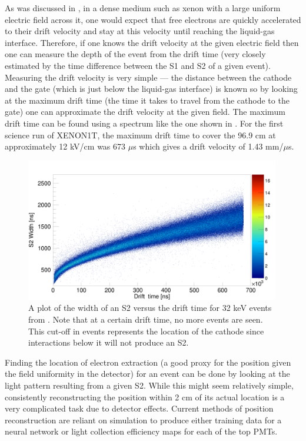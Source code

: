 As was discussed in , in a dense medium such as xenon with a large uniform electric field across it, one would expect that free electrons are quickly accelerated to their drift velocity and stay at this velocity until reaching the liquid-gas interface.  Therefore, if one knows the drift velocity at the given electric field then one can measure the depth of the event from the drift time (very closely estimated by the time difference between the S1 and S2 of a given event).  Measuring the drift velocity is very simple --- the distance between the cathode and the gate (which is just below the liquid-gas interface) is known so by looking at the maximum drift time (the time it takes to travel from the cathode to the gate) one can approximate the drift velocity at the given field.  The maximum drift time can be found using a spectrum like the one shown in .  For the first science run of XENON1T, the maximum drift time to cover the 96.9 cm at approximately 12 kV/cm was 673 $\mu$s which gives a drift velocity of 1.43 mm/$\mu$s.


\begin{figure}[t]
	\centering
	\includegraphics[width=0.99\textwidth]{xe1t_drift_time_vs_width}
	\caption{A plot of the width of an S2 versus the drift time for 32 keV events from .  Note that at a certain drift time, no more events are seen.  This cut-off in events represents the location of the cathode since interactions below it will not produce an S2.}
	\label{fig:xe1t_drift_time_vs_width}
\end{figure}


Finding the location of electron extraction (a good proxy for the position given the field uniformity in the detector) for an event can be done by looking at the light pattern resulting from a given S2.  While this might seem relatively simple, consistently reconstructing the position within 2 cm of its actual location is a very complicated task due to detector effects.  Current methods of position reconstruction are reliant on simulation to produce either training data for a neural network or light collection efficiency maps for each of the top PMTs.  


